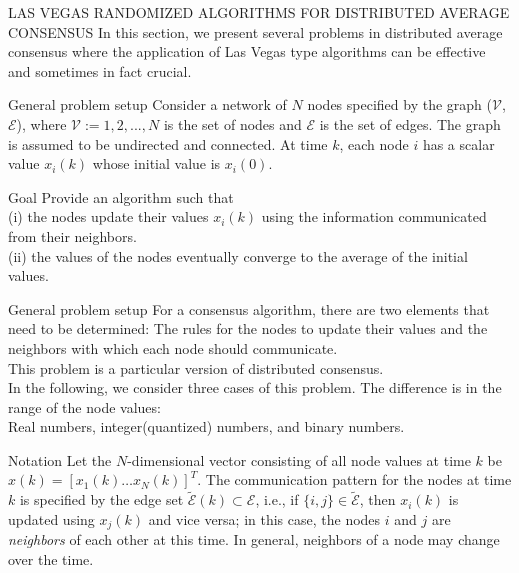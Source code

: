 \documentclass[xcolor={dvipsnames}]{beamer}
\begin{document}
    \begin{frame}{LAS VEGAS RANDOMIZED ALGORITHMS FOR DISTRIBUTED AVERAGE CONSENSUS}
		In this section, we present several problems in distributed average consensus where the application 
        of Las Vegas type algorithms can be effective and sometimes in fact crucial.
	\end{frame}
	
	\begin{frame}{General problem setup}
		Consider a network of $N$ nodes specified by the graph ($\mathscr{V}$, $\mathscr{E}$), 
        where $\mathscr{V} := {1, 2, . . . , N }$ is the set of nodes and $\mathscr{E}$ is the set of edges. 
        The graph is assumed to be undirected and connected. At time $k$, each node $i$ has a scalar value $x_i(k)$ 
        whose initial value is $x_i(0)$.
		
		\begin{block}{Goal}
			Provide an algorithm such that\\
			(i) the nodes update their values $x_i(k)$ using the information communicated from their neighbors.\\
			(ii) the values of the nodes eventually converge to the average of the initial values.
		\end{block}
	\end{frame}
	
	\begin{frame}{General problem setup}
		For a consensus algorithm, there are two elements that need to be determined: 
        The rules for the nodes to update their values and the neighbors with which each node should communicate.\\
		This problem is a particular version of distributed consensus.\\
		In the following, we consider three cases of this problem. The difference is in the 
        range of the node values:\\ \alert{Real numbers}, \alert{integer(quantized) numbers}, and \alert{binary numbers}. 
	\end{frame}
	
	\begin{frame}{Notation}
		Let the $N$-dimensional vector consisting of all node values at 
        time $k$ be $x(k) = [x_1(k) \hdots x_N(k)]^T$. The communication pattern 
        for the nodes at time $k$ is specified by the edge set $\tilde{\mathscr{E}}(k) \subset \mathscr{E}$, 
        i.e., if $\{i, j\} \in \tilde{\mathscr{E}}$, then $x_i(k)$ is updated using $x_j(k)$ and vice versa; 
        in this case, the nodes $i$ and $j$ are \emph{neighbors} of each other at this time. In general, 
        neighbors of a node may change over the time.
	\end{frame}
	
\end{document}
